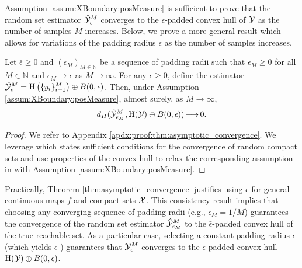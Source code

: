 \documentclass[12pt]{l4dc2022} %
\begin{document}
Assumption \ref{assum:XBoundary:posMeasure} is sufficient to prove that the random set estimator $\hat{\mathcal{Y}}_\epsilon^M$ converges to the $\epsilon$-padded convex hull of $\mathcal{Y}$ as the number of samples $M$ increases. 
Below, we prove a more general result which allows for variations of the padding radius $\epsilon$ as the number of samples increases. 
% 
% 

\begin{thm}\label{thm:asymptotic_convergence}
Let $\bar{\epsilon}\geq 0$ and 
$(\epsilon_M)_{M\in\mathbb{N}}$ be a sequence of padding radii such that $\epsilon_M\geq 0$ for all $M\in\mathbb{N}$ and $\epsilon_M\rightarrow \bar{\epsilon}$ as $M\rightarrow\infty$. 
For any $\epsilon\geq 0$, define the estimator $\hat{\mathcal{Y}}^M_{\epsilon}=\textrm{H}\left(\{y_i\}_{i{=}1}^M\right)\oplus B(0,\epsilon)$.  
Then, under Assumption \ref{assum:XBoundary:posMeasure}, 
almost surely, 
as $M\rightarrow\infty$, 
$$
d_H(
\hat{\mathcal{Y}}_{\epsilon_M}^M, 
\textrm{H}(\mathcal{Y})\oplus B(0,\bar{\epsilon})
)
\mathop{\longrightarrow} 0.
$$
\end{thm}

\begin{proof}
We refer to Appendix \ref{apdx:proof:thm:asymptotic_convergence}. 
We leverage \citep[Proposition 1.7.23]{Molchanov_BookTheoryOfRandomSets2017} which states sufficient conditions for the convergence of random compact sets %
and use properties of the convex hull to relax the corresponding assumption in \citep{LewPavone2020} with Assumption  \ref{assum:XBoundary:posMeasure}. 
\end{proof}
\vspace{-3mm}
% 
Practically, Theorem \ref{thm:asymptotic_convergence} justifies using $\epsilon$-\randup for general continuous maps $f$ and compact sets $\mathcal{X}$. 
This consistency result implies that choosing any converging sequence of padding radii (e.g., $\epsilon_M=1/M$) guarantees the convergence of the random set estimator $\hat{\mathcal{Y}}_{\epsilon_M}^M$  to the $\bar{\epsilon}$-padded convex hull of the true reachable set. 
As a particular case, selecting a constant padding radius $\epsilon$ (which yields $\epsilon$-\randup) guarantees that $\mathcal{Y}_{\epsilon}^M$ converges to the $\epsilon$-padded convex hull $\textrm{H}(\mathcal{Y})\oplus B(0,\epsilon)$.  
\end{document}
